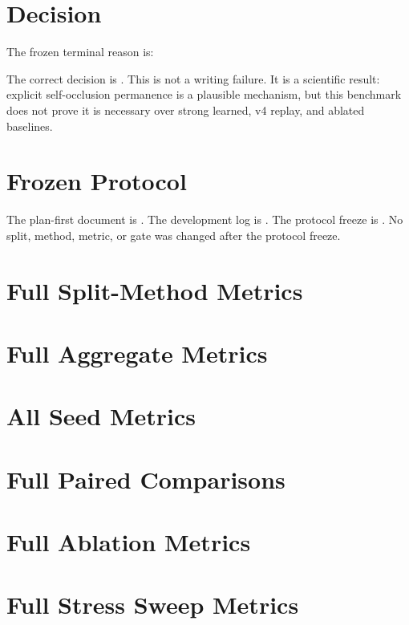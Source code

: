 \documentclass{article}
\begin{document}
\section{Decision}
The frozen terminal reason is:
\begin{quote}\small\raggedright
\PaperReason{}\par
\end{quote}
The correct decision is \textbf{\PaperDecision{}}.
This is not a writing failure.
It is a scientific result: explicit self-occlusion permanence is a plausible mechanism, but this benchmark does not prove it is necessary over strong learned, v4 replay, and ablated baselines.

\clearpage
\appendix
\section{Frozen Protocol}
The plan-first document is .
The development log is .
The protocol freeze is .
No split, method, metric, or gate was changed after the protocol freeze.

\section{Full Split-Method Metrics}


\section{Full Aggregate Metrics}


\section{All Seed Metrics}


\section{Full Paired Comparisons}


\section{Full Ablation Metrics}


\section{Full Stress Sweep Metrics}




\end{document}
